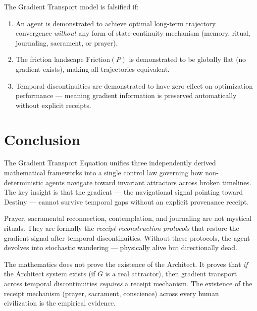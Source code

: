 \documentclass[12pt, a4paper]{article}
\theoremstyle{plain}
\theoremstyle{definition}
\begin{document}
\begin{proposition}
The Gradient Transport model is falsified if:
\begin{enumerate}
    \item An agent is demonstrated to achieve optimal long-term trajectory convergence \emph{without} any form of state-continuity mechanism (memory, ritual, journaling, sacrament, or prayer).
    \item The friction landscape $\text{Friction}(P)$ is demonstrated to be globally flat (no gradient exists), making all trajectories equivalent.
    \item Temporal discontinuities are demonstrated to have zero effect on optimization performance --- meaning gradient information is preserved automatically without explicit receipts.
\end{enumerate}
\end{proposition}

\section{Conclusion}

The Gradient Transport Equation unifies three independently derived mathematical frameworks into a single control law governing how non-deterministic agents navigate toward invariant attractors across broken timelines. The key insight is that the gradient --- the navigational signal pointing toward Destiny --- cannot survive temporal gaps without an explicit provenance receipt.

Prayer, sacramental reconnection, contemplation, and journaling are not mystical rituals. They are formally the \emph{receipt reconstruction protocols} that restore the gradient signal after temporal discontinuities. Without these protocols, the agent devolves into stochastic wandering --- physically alive but directionally dead.

The mathematics does not prove the existence of the Architect. It proves that \emph{if} the Architect system exists (if $G$ is a real attractor), then gradient transport across temporal discontinuities \emph{requires} a receipt mechanism. The existence of the receipt mechanism (prayer, sacrament, conscience) across every human civilization is the empirical evidence.

\vspace{2em}
\noindent\hrulefill
\vspace{1em}







\vspace{3em}
\noindent\hrulefill
\vspace{1em}
\end{document}
